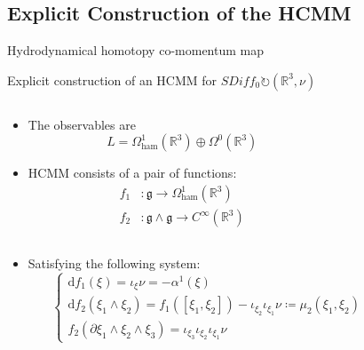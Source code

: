 \documentclass[handout,10pt]{beamer}
\begin{document}
  \subsection{Explicit Construction of the HCMM}
  \begin{frame}{Hydrodynamical homotopy co-momentum map}
  	\begin{claimblock}
  		Explicit construction of an HCMM for $SDiff_0 \circlearrowright (\mathbb{R}^3,\nu)$
  	\end{claimblock}
	\begin{columns}
		\begin{column}[c]{.5\linewidth}
		  	\begin{itemize}
		  		\item The observables are  $$L= \Omega^1_{\textrm{ham}}(\mathbb{R}^3)\oplus\Omega^0(\mathbb{R}^3)$$
		  		\item HCMM consists of a pair of functions:
					\begin{align*}
						f_1 &\colon \mathfrak{g} \rightarrow \Omega^1_{\textrm{ham}}(\mathbb{R}^3) \\
						f_2 &\colon \mathfrak{g}\wedge\mathfrak{g} \rightarrow C^\infty(\mathbb{R}^3)
					\end{align*}	
		  	\end{itemize}
		\end{column}	
	  	\hfill  	
		\begin{column}[c]{.5\linewidth}
  		
 	 	\end{column}
 	 \end{columns}
 	\begin{columns}
		\begin{column}[c]{.8\linewidth}
		 	 \begin{itemize}
				\item Satisfying the following system:
					\begin{displaymath}
						\begin{cases}
							\textrm{d} f_1(\xi) = \iota_\xi \nu = -\alpha^1(\xi) \\
							\textrm{d} f_2(\xi_1 \wedge \xi_2) = f_1\left([\xi_1,\xi_2]\right) - \iota_{\xi_2}\iota_{\xi_1} \nu 
							 \coloneqq \mu_2(\xi_1,\xi_2)\\
							f_2\left(\partial \xi_1 \wedge \xi_2 \wedge \xi_3 \right) = \iota_{\xi_3}\iota_{\xi_2}\iota_{\xi_1} \nu
						\end{cases}
					\end{displaymath}
		 	 \end{itemize}
 	 	\end{column}
		\begin{column}[c]{.2\linewidth}
 	 	\end{column}
 	 \end{columns}
  \end{frame}
\end{document}
